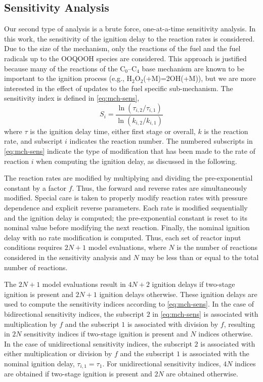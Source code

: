 \documentclass[../main.tex]{subfiles}
\begin{document}
\subsection{Sensitivity Analysis}
\label{sec:mch-sensitivity-analysis}

Our second type of analysis is a brute force, one-at-a-time sensitivity
analysis. In this work, the sensitivity of the ignition delay to the reaction
rates is considered. Due to the size of the mechanism, only the reactions of
the fuel and the fuel radicals up to the OOQOOH species are considered. This
approach is justified because many of the reactions of the C$_0$--C$_4$ base
mechanism are known to be important to the ignition process (e.g.,
H$_2$O$_2$(+M)=2OH(+M)), but we are more interested in the effect of updates to
the fuel specific sub-mechanism. The sensitivity index is defined in
\cref{eq:mch-sens},
%
\begin{equation}
    \label{eq:mch-sens}
    S_i = \frac{\ln\left(\tau_{i,2}/\tau_{i,1}\right)}{\ln\left(k_{i,2}/k_{i,1}\right)}
\end{equation}
%
where $\tau$ is the ignition delay time, either first stage or overall, $k$ is
the reaction rate, and subscript $i$ indicates the reaction number. The
numbered subscripts in \cref{eq:mch-sens} indicate the type of modification
that has been made to the rate of reaction $i$ when computing the ignition
delay, as discussed in the following.

The reaction rates are modified by multiplying and dividing the pre-exponential
constant by a factor $f$. Thus, the forward and reverse rates are
simultaneously modified. Special care is taken to properly modify reaction
rates with pressure dependence and explicit reverse parameters. Each rate is
modified sequentially and the ignition delay is computed; the pre-exponential
constant is reset to its nominal value before modifying the next reaction.
Finally, the nominal ignition delay with no rate modification is computed.
Thus, each set of reactor input conditions requires $2N+1$ model evaluations,
where $N$ is the number of reactions considered in the sensitivity analysis
and $N$ may be less than or equal to the total number of reactions.

The $2N+1$ model evaluations result in $4N+2$ ignition delays if two-stage
ignition is present and $2N+1$ ignition delays otherwise. These ignition delays
are used to compute the sensitivity indices according to \cref{eq:mch-sens}.
In the case of bidirectional sensitivity indices, the subscript $2$ in
\cref{eq:mch-sens} is associated with multiplication by $f$ and the subscript
$1$ is associated with division by $f$, resulting in $2N$ sensitivity indices if
two-stage ignition is present and $N$ indices otherwise. In the case of
unidirectional sensitivity indices, the subscript $2$ is associated with either
multiplication or division by $f$ and the subscript $1$ is associated with the
nominal ignition delay, $\tau_{i,1}=\tau_1$. For unidirectional sensitivity
indices, $4N$ indices are obtained if two-stage ignition is present and $2N$ are
obtained otherwise.
\end{document}
